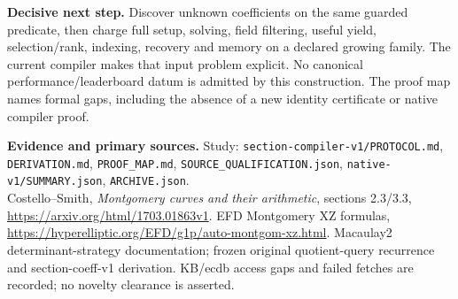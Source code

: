 \documentclass[10pt,a4paper]{article}
\begin{document}
\textbf{Decisive next step.}
Discover unknown coefficients on the same guarded predicate, then charge full
setup, solving, field filtering, useful yield, selection/rank, indexing,
recovery and memory on a declared growing family. The current compiler makes
that input problem explicit. No canonical performance/leaderboard datum is
admitted by this construction. The proof map names formal gaps, including the
absence of a new identity certificate or native compiler proof.

{\small\textbf{Evidence and primary sources.}
Study: \texttt{section-compiler-v1/PROTOCOL.md}, \texttt{DERIVATION.md},
\texttt{PROOF\_MAP.md}, \texttt{SOURCE\_QUALIFICATION.json},
\texttt{native-v1/SUMMARY.json}, \texttt{ARCHIVE.json}.\\
Costello--Smith, \emph{Montgomery curves and their arithmetic}, sections 2.3/3.3,
\url{https://arxiv.org/html/1703.01863v1}. EFD Montgomery XZ formulas,
\url{https://hyperelliptic.org/EFD/g1p/auto-montgom-xz.html}.
Macaulay2 determinant-strategy documentation; frozen original quotient-query
recurrence and section-coeff-v1 derivation. KB/ecdb access gaps and failed
fetches are recorded; no novelty clearance is asserted.}
\end{document}
